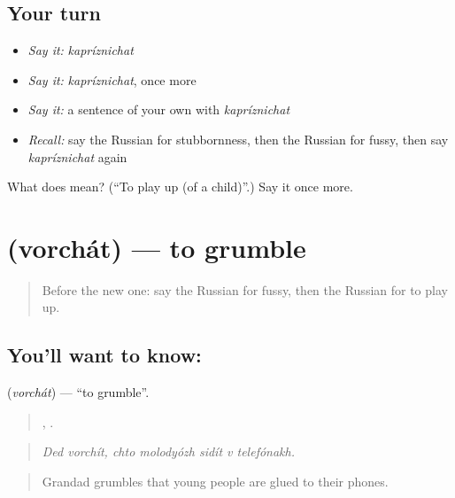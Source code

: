 \subsection*{Your turn}
\begin{itemize}
\raggedright
  \item \emph{Say it:} \emph{kapríznichat}
  \item \emph{Say it:} \emph{kapríznichat}, once more
  \item \emph{Say it:} a sentence of your own with \emph{kapríznichat}
  \item \emph{Recall:} say the Russian for stubbornness, then the Russian for fussy, then say \emph{kapríznichat} again
\end{itemize}

\begin{tcolorbox}[breakable,colback=teal!4,colframe=teal!35!black,title={Before you move on}]
What does  mean? (\textquotedblleft{}To play up (of a child)\textquotedblright{}.) Say it once more.
\end{tcolorbox}
\section[\texorpdfstring{\ru{ворчать} (vorchát)}{ворчать (vorchát)}]{ (vorchát) — to grumble}

\label{lesson:RU-C478-vorchat}



\begin{quote}
Before the new one: say the Russian for fussy, then the Russian for to play up.
\end{quote}

\subsection*{You'll want to know: }
\textbf{} (\emph{vorchát}) — \textquotedblleft{}to grumble\textquotedblright{}.

\begin{quote}
 ,     .
\end{quote}

\begin{quote}
\emph{Ded vorchít, chto molodyózh sidít v telefónakh.}
\end{quote}

\begin{quote}
Grandad grumbles that young people are glued to their phones.
\end{quote}

